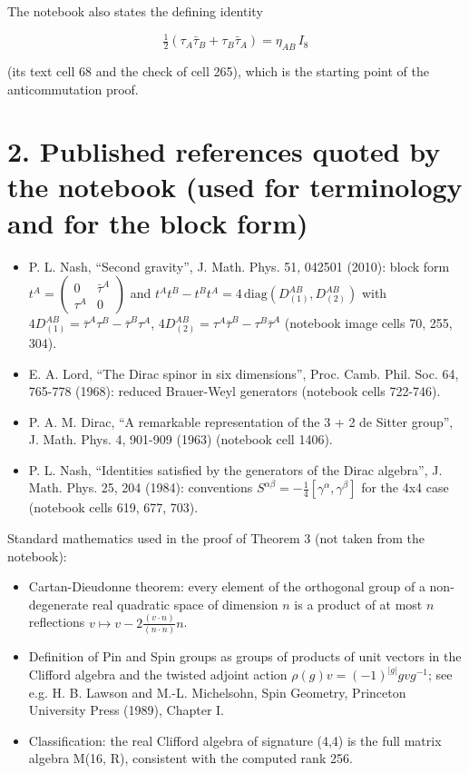 \documentclass[10pt]{article}
\makeatletter
\newcommand\keepnext{\par\nopagebreak\@nobreaktrue\everypar{\@nobreakfalse\everypar{}}}
\makeatother
\begin{document}
The notebook also states the defining identity\keepnext


\[
\tfrac12\left(\tau_A\bar\tau_B + \tau_B\bar\tau_A\right) = \eta_{AB}\,I_8
\]

(its text cell 68 and the check of cell 265), which is the starting point of the anticommutation proof.


\section*{2. Published references quoted by the notebook (used for terminology and for the block form)}

\begin{itemize}
\item P. L. Nash, ``Second gravity'', J. Math. Phys. 51, 042501 (2010): block form $t^A = \begin{pmatrix}0&\bar\tau^A\\ \tau^A&0\end{pmatrix}$ and $t^At^B - t^Bt^A = 4\,\mathrm{diag}(D_{(1)}^{AB}, D_{(2)}^{AB})$ with $4D_{(1)}^{AB} = \bar\tau^A\tau^B - \bar\tau^B\tau^A$, $4D_{(2)}^{AB} = \tau^A\bar\tau^B - \tau^B\bar\tau^A$ (notebook image cells 70, 255, 304).
\item E. A. Lord, ``The Dirac spinor in six dimensions'', Proc. Camb. Phil. Soc. 64, 765-778 (1968): reduced Brauer-Weyl generators (notebook cells 722-746).
\item P. A. M. Dirac, ``A remarkable representation of the 3 + 2 de Sitter group'', J. Math. Phys. 4, 901-909 (1963) (notebook cell 1406).
\item P. L. Nash, ``Identities satisfied by the generators of the Dirac algebra'', J. Math. Phys. 25, 204 (1984): conventions $S^{\alpha\beta} = -\tfrac14[\gamma^\alpha,\gamma^\beta]$ for the 4x4 case (notebook cells 619, 677, 703).
\end{itemize}

Standard mathematics used in the proof of Theorem 3 (not taken from the notebook):\keepnext


\begin{itemize}
\item Cartan-Dieudonne theorem: every element of the orthogonal group of a non-degenerate real quadratic space of dimension $n$ is a product of at most $n$ reflections $v \mapsto v - 2\frac{(v\cdot n)}{(n\cdot n)}n$.
\item Definition of Pin and Spin groups as groups of products of unit vectors in the Clifford algebra and the twisted adjoint action $\rho(g)v = (-1)^{|g|}gvg^{-1}$; see e.g. H. B. Lawson and M.-L. Michelsohn, Spin Geometry, Princeton University Press (1989), Chapter I.
\item Classification: the real Clifford algebra of signature (4,4) is the full matrix algebra M(16, R), consistent with the computed rank 256.
\end{itemize}
\end{document}
